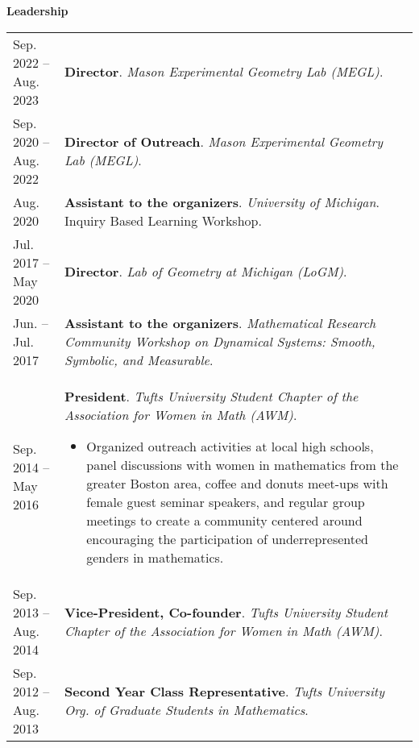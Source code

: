 
    \medskip


    \medskip
    \medskip



    \textbf{\large Leadership}
    
    \begin{center}
    {
    \renewcommand{\arraystretch}{1.2}
    \begin{longtable}{p{}  p{}}
     Sep.  2022 --  Aug.  2023 & \textbf{Director}. \textit{Mason Experimental Geometry Lab (MEGL)}.  \\ 
 Sep.  2020 --  Aug.  2022 & \textbf{Director of Outreach}. \textit{Mason Experimental Geometry Lab (MEGL)}.  \\ 
 Aug.  2020 & \textbf{Assistant to the organizers}. \textit{University of Michigan}.  Inquiry Based Learning Workshop.  \\ 
 Jul.  2017 --  May  2020 & \textbf{Director}. \textit{Lab of Geometry at Michigan (LoGM)}.  \\ 
 Jun.  --  Jul.  2017 & \textbf{Assistant to the organizers}. \textit{Mathematical Research Community Workshop on Dynamical Systems: Smooth, Symbolic, and Measurable}.  \\ 
 Sep.  2014 --  May  2016 & \textbf{President}. \textit{Tufts University Student Chapter of the Association for Women in Math (AWM)}. 
        \hspace{-1em}

        {\small
        \begin{itemize}
        \setlength{\parindent}{0em}
        \item[] Organized outreach activities at local high schools, panel discussions with women in mathematics from the greater Boston area, coffee and donuts meet-ups with female guest seminar speakers, and regular group meetings to create a community centered around encouraging the participation of underrepresented genders in mathematics.
        \end{itemize}
        }
        \vspace{-1em}
         \\ 
 Sep.  2013 --  Aug.  2014 & \textbf{Vice-President, Co-founder}. \textit{Tufts University Student Chapter of the Association for Women in Math (AWM)}.  \\ 
 Sep.  2012 --  Aug.  2013 & \textbf{Second Year Class Representative}. \textit{Tufts University Org. of Graduate Students in Mathematics}.  
    \end{longtable}
    } 
    \end{center}

